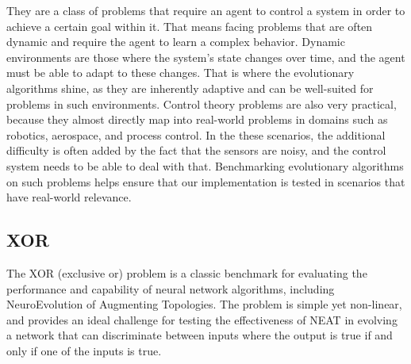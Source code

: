 \documentclass{article}
\begin{document}
    They are a class of problems that require an agent to control a system in order to achieve
    a certain goal within it.
    That means facing problems that are often dynamic and require the agent to learn a complex behavior. 
    Dynamic environments are those where the system's state changes over time, and the agent must be able to adapt to these changes.
    That is where the evolutionary algorithms shine, as they are inherently adaptive and can be well-suited for problems in such environments.
    Control theory problems are also very practical, because they almost directly map into real-world problems in domains such as robotics,
    aerospace, and process control. In the these scenarios, the additional difficulty is often added by the fact
    that the sensors are noisy, and the control system needs to be able to deal with that. 
    Benchmarking evolutionary algorithms on such problems helps ensure that our implementation
    is tested in scenarios that have real-world relevance.
    
        \subsection{XOR}
        The XOR (exclusive or) problem is a classic benchmark for evaluating the performance and capability of neural network algorithms,
        including NeuroEvolution of Augmenting Topologies.
        The problem is simple yet non-linear, and provides an ideal challenge for testing the effectiveness of NEAT in evolving
        a network that can discriminate between inputs where the output is true if and only if one of the inputs is true.

\begin{table}[H]
    \center
        \caption{Truth table for XOR}
    \end{table}
\end{document}
